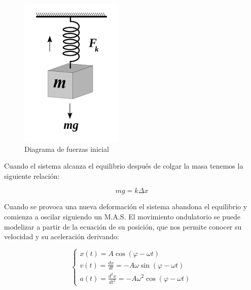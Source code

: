 \documentclass[a4paper,12pt,titlepage]{article}
\begin{document}
\begin{figure}
    \centering
    \includegraphics[width=0.75\linewidth]{Images/fuerzas hooke.png}
    \caption{Diagrama de fuerzas inicial}
    \label{Diagrama fuerzas}
\end{figure}

Cuando el sistema alcanza el equilibrio después de colgar la masa tenemos la siguiente relación:

\begin{equation}
    mg = k\Delta x
    \label{Met estatico}
\end{equation}

Cuando se provoca una nueva deformación el sistema abandona el equilibrio y comienza a oscilar siguiendo un M.A.S. El movimiento ondulatorio se puede modelizar a partir de la ecuación de su posición, que nos permite conocer su velocidad y su aceleración derivando:

\begin{equation}
    \left\{ \begin{array}{l}
        x(t) = A \cos (\varphi - \omega t) \\
        v(t) = \frac{dx}{dt} = -A \omega \sin (\varphi - \omega t) \\
        a(t) = \frac{d^2x}{dt^2} = -A \omega^2 \cos (\varphi - \omega t)
        \end{array}
    \right.
\end{equation}
\end{document}
